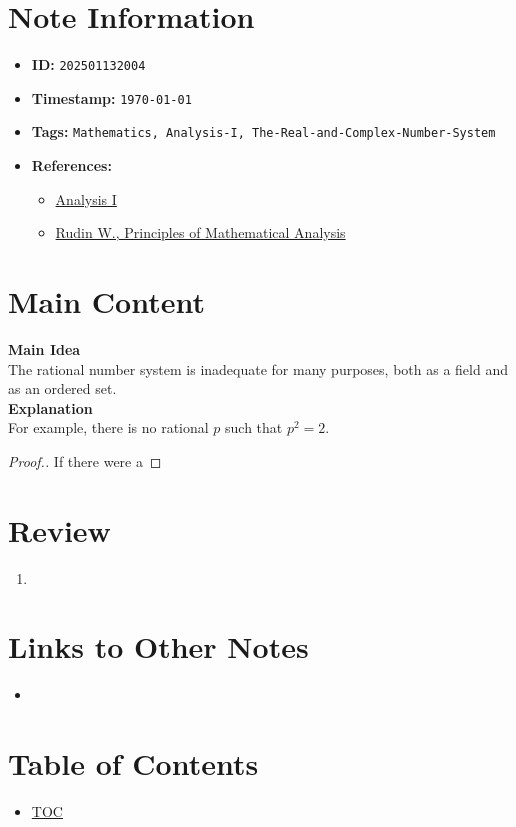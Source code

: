 \clearpage
{}
\label{202501132004}
\renewcommand{\notetitle}{Rationals are Inadequate}

\section*{Note Information}
\begin{itemize}
  \item \textbf{ID:} \texttt{202501132004}
  \item \textbf{Timestamp:} \texttt{\today \ \currenttime}
  \item \textbf{Tags:} \texttt{Mathematics, Analysis-I, The-Real-and-Complex-Number-System}
  \item \textbf{References:}
    \begin{itemize}
      \item \href{https://ocw.mit.edu/courses/18-100b-analysis-i-fall-2010/}{Analysis I}
      \item \href{/home/garrett/Personal/References/Mathematics/Analysis-I/Rudin.pdf}{Rudin W., Principles of Mathematical Analysis}
    \end{itemize}
\end{itemize}


\section*{Main Content}
\textbf{Main Idea}\\
The rational number system is inadequate for many purposes, both as a field and as an ordered set.\\

\textbf{Explanation}\\
For example, there is no rational $p$ such that $p^2 = 2$.\\

\begin{proof}[Proof.]
  If there were a 
\end{proof}

\section*{Review}
\begin{enumerate}
  \item 
\end{enumerate}


\section*{Links to Other Notes}
\begin{itemize}
  \item \hyperref[]{}
\end{itemize}

\section*{Table of Contents}

\begin{itemize}
  \item \hyperref[toc]{TOC}
\end{itemize}

